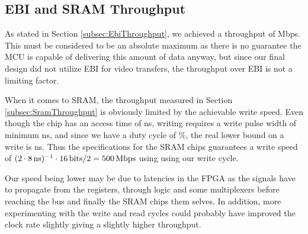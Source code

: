 \subsection{EBI and SRAM Throughput}
As stated in Section \ref{subsec:EbiThroughput}, we achieved a throughput of \unit[384]{Mbps}.
This must be considered to be an absolute maximum as there is no guarantee the MCU is capable of delivering this amount of data anyway, but since our final design did not utilize EBI for video transfers, the throughput over EBI is not a limiting factor.

When it comes to SRAM, the throughput measured in Section \ref{subsec:SramThroughput} is obviously limited by the achievable write speed.
Even though the chip has an access time of \unit[10]{ns}, writing requires a write pulse width of minimum \unit[8]{ns}, and since we have a duty cycle of \unit[50]{\%}, the real lower bound on a write is \unit[16]{ns}.
Thus the specifications for the SRAM chips guarantees a write speed of $(2\cdot\unit[8]{ns})^{-1} \cdot \unit[16]{bits} / 2 = \unit[500]{Mbps}$ using using our write cycle.

Our speed being lower may be due to latencies in the FPGA as the signals have to propagate from the registers, through logic and some multiplexers before reaching the bus and finally the SRAM chips them selves. In addition, more experimenting with the write and read cycles could probably have improved the clock rate slightly giving a slightly higher throughput.
